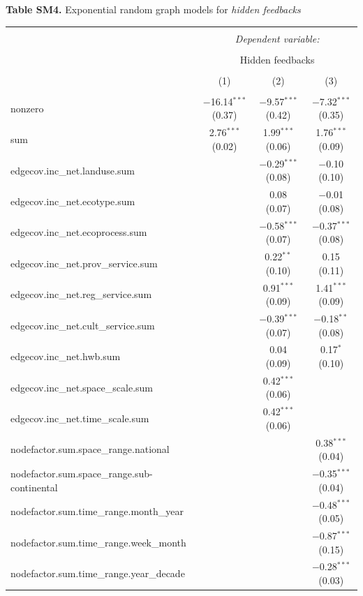 \documentclass[9pt,]{article}
\begin{document}
\textbf{Table SM4.} Exponential random graph models for
\textit{hidden feedbacks}

\begingroup
\footnotesize

\begin{tabular}{@{\extracolsep{5pt}}lccc}
\\[-1.8ex]\hline
\hline \\[-1.8ex]
 & \multicolumn{3}{c}{\textit{Dependent variable:}} \\
\cline{2-4}
\\[-1.8ex] & \multicolumn{3}{c}{Hidden feedbacks} \\
\\[-1.8ex] & (1) & (2) & (3)\\
\hline \\[-1.8ex]
 nonzero & $-$16.14$^{***}$ (0.37) & $-$9.57$^{***}$ (0.42) & $-$7.32$^{***}$ (0.35) \\
  sum & 2.76$^{***}$ (0.02) & 1.99$^{***}$ (0.06) & 1.76$^{***}$ (0.09) \\
  edgecov.inc\_net.landuse.sum &  & $-$0.29$^{***}$ (0.08) & $-$0.10 (0.10) \\
  edgecov.inc\_net.ecotype.sum &  & 0.08 (0.07) & $-$0.01 (0.08) \\
  edgecov.inc\_net.ecoprocess.sum &  & $-$0.58$^{***}$ (0.07) & $-$0.37$^{***}$ (0.08) \\
  edgecov.inc\_net.prov\_service.sum &  & 0.22$^{**}$ (0.10) & 0.15 (0.11) \\
  edgecov.inc\_net.reg\_service.sum &  & 0.91$^{***}$ (0.09) & 1.41$^{***}$ (0.09) \\
  edgecov.inc\_net.cult\_service.sum &  & $-$0.39$^{***}$ (0.07) & $-$0.18$^{**}$ (0.08) \\
  edgecov.inc\_net.hwb.sum &  & 0.04 (0.09) & 0.17$^{*}$ (0.10) \\
  edgecov.inc\_net.space\_scale.sum &  & 0.42$^{***}$ (0.06) &  \\
  edgecov.inc\_net.time\_scale.sum &  & 0.42$^{***}$ (0.06) &  \\
  nodefactor.sum.space\_range.national &  &  & 0.38$^{***}$ (0.04) \\
  nodefactor.sum.space\_range.sub-continental &  &  & $-$0.35$^{***}$ (0.04) \\
  nodefactor.sum.time\_range.month\_year &  &  & $-$0.48$^{***}$ (0.05) \\
  nodefactor.sum.time\_range.week\_month &  &  & $-$0.87$^{***}$ (0.15) \\
  nodefactor.sum.time\_range.year\_decade &  &  & $-$0.28$^{***}$ (0.03) \\

\end{tabular}
\end{document}

